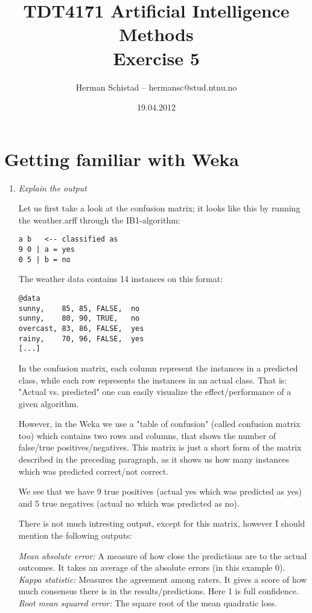 \documentclass{article}
\title{TDT4171 Artificial Intelligence Methods \\ Exercise 5}
\author{Herman Schistad -- hermansc@stud.ntnu.no}
\date{19.04.2012}
\begin{document}
\maketitle

\section*{Getting familiar with Weka}

\begin{enumerate}[1.]

\item \textit{Explain the output}

Let us first take a look at the confusion matrix; it looks like this by running
the weather.arff through the IB1-algorithm:

\begin{verbatim}
a b   <-- classified as
9 0 | a = yes
0 5 | b = no
\end{verbatim}

The weather data contains 14 instances on this format:

\begin{verbatim}
@data
sunny,    85, 85, FALSE,  no
sunny,    80, 90, TRUE,   no
overcast, 83, 86, FALSE,  yes
rainy,    70, 96, FALSE,  yes
[...]
\end{verbatim}

In the confusion matrix, each column represent the instances in a predicted
class, while each row represents the instances in an actual class. That is:
"Actual vs. predicted" one can easily visualize the effect/performance of a
given algorithm. 

However, in the Weka we use a "table of confusion" (called confusion matrix
too) which contains two rows and columns, that shows the number of false/true
positives/negatives. This matrix is just a short form of the matrix described
in the preceding paragraph, as it shows us how many instances which was
predicted correct/not correct.

We see that we have 9 true positives (actual yes which was predicted as
yes) and 5 true negatives (actual no which was predicted as no).

There is not much intresting output, except for this matrix, however I should
mention the following outputs:

\textit{ Mean absolute error:} A measure of how close the predictions are to the
actual outcomes. It takes an average of the absolute errors (in this example
0).
\textit{ Kappa statistic:} Measures the agreement among raters. It gives a score
of how much consensus there is in the results/predictions. Here 1 is full
confidence.
\textit{ Root mean squared error:} The square root of the mean quadratic loss.


\end{enumerate}
\end{document}
